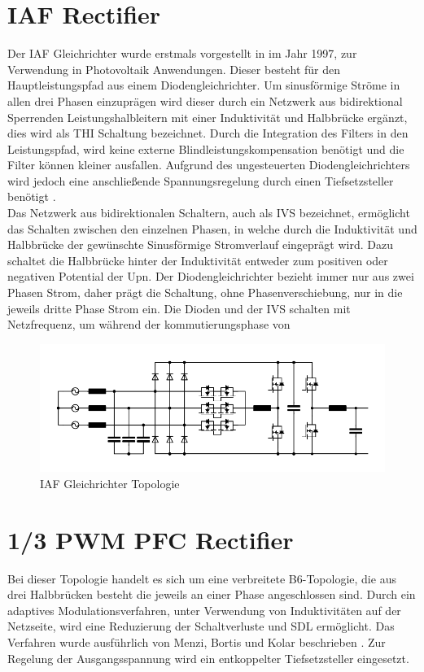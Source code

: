 \section{IAF Rectifier }
	Der \gls{IAF} Gleichrichter wurde erstmals vorgestellt in \cite{IAFfirst} im Jahr 1997, zur Verwendung in Photovoltaik Anwendungen. Dieser besteht für den Hauptleistungspfad aus einem Diodengleichrichter. Um sinusförmige Ströme in allen drei Phasen einzuprägen wird dieser durch ein Netzwerk aus bidirektional Sperrenden Leistungshalbleitern mit einer Induktivität und Halbbrücke ergänzt, dies wird als \gls{THI} Schaltung bezeichnet. Durch die Integration des Filters in den Leistungspfad, wird keine externe Blindleistungskompensation benötigt und die Filter können kleiner ausfallen. Aufgrund des ungesteuerten Diodengleichrichters wird jedoch eine anschließende Spannungsregelung durch einen Tiefsetzsteller benötigt \cite{ThesisSchrittwieserBuckTypePFC_2017}.\\
	Das Netzwerk aus bidirektionalen Schaltern, auch als \gls{IVS} bezeichnet, ermöglicht das Schalten zwischen den einzelnen Phasen, in welche durch die Induktivität und Halbbrücke der gewünschte Sinusförmige Stromverlauf eingeprägt wird. Dazu schaltet die Halbbrücke hinter der Induktivität entweder zum positiven oder negativen Potential der \gls{Upn}. Der Diodengleichrichter bezieht immer nur aus zwei Phasen Strom, daher prägt die Schaltung, ohne Phasenverschiebung, nur in die jeweils dritte Phase Strom ein. Die Dioden und der \gls{IVS} schalten mit Netzfrequenz, um während der kommutierungsphase von 
	\begin{figure}
		\centering
		\includegraphics[width=0.9\linewidth]{content/Grafiken/IAF}
		\caption[\gls{IAF} Gleichrichter Topologie]{\gls{IAF} Gleichrichter Topologie}
		\label{fig:iaf}
	\end{figure}


\section{1/3 PWM PFC Rectifier}
	\label{sec:GrundlagenB6}
	Bei dieser Topologie handelt es sich um eine verbreitete B6-Topologie, die aus drei Halbbrücken besteht die jeweils an einer Phase angeschlossen sind. Durch ein adaptives Modulationsverfahren, unter Verwendung von Induktivitäten auf der Netzseite, wird eine Reduzierung der Schaltverluste und \gls{SDL} ermöglicht. Das Verfahren wurde ausführlich von Menzi, Bortis und Kolar beschrieben \cite{13PWMPFC}. Zur Regelung der Ausgangsspannung wird ein entkoppelter Tiefsetzsteller eingesetzt.\\
	
